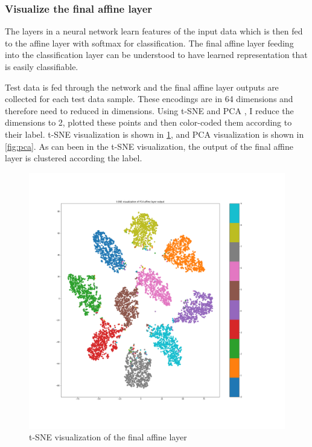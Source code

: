 \documentclass[10pt,twocolumn,letterpaper]{article}
\begin{document}
\subsubsection{Visualize the final affine layer}

The layers in a neural network learn features of the input data which is then fed to the affine layer with softmax for classification. The final affine layer feeding into the classification layer can be understood to have learned representation that is easily classifiable.

Test data is fed through the network and the final affine layer outputs are collected for each test data sample. These encodings are in 64 dimensions and therefore need to reduced in dimensions. Using t-SNE \cite{maaten2008visualizing} and PCA \cite{wold1987principal}, I reduce the dimensions to 2, plotted these points and then color-coded them according to their label. t-SNE visualization is shown in \ref{fig:tsne}, and PCA visualization is shown in \ref{fig:pca}. As can been in the t-SNE visualization, the output of the final affine layer is clustered according the label.


\begin{figure}%
\centering
\includegraphics[scale=0.15]{images/1-fc-mnist/tsne_fc4_output}
\caption{t-SNE visualization of the final affine layer}
\label{fig:tsne}
\end{figure}
\end{document}
